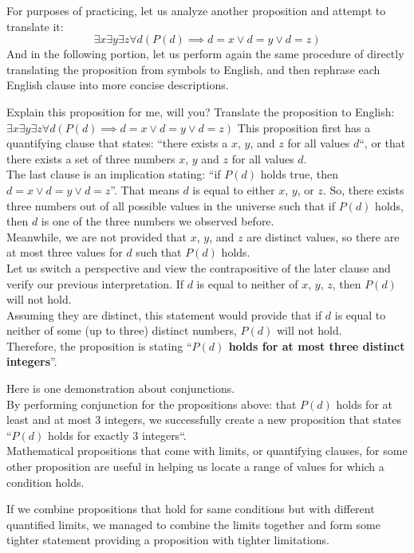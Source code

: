 For purposes of practicing, let us analyze another proposition and attempt to translate it:
\[\exists x \exists y \exists z \forall d (P(d) \implies d = x \lor d = y \lor d = z)\]
And in the following portion, let us perform again the same procedure of directly translating the proposition from symbols to English, and then rephrase each English clause into more concise descriptions.
\begin{ln-think}{Explain this proposition for me, will you?}{}
    Translate the proposition to English: $\exists x \exists y \exists z \forall d (P(d) \implies d = x \lor d = y \lor d = z)$
    \tcblower
    This proposition first has a quantifying clause that states: ``there exists a $x$, $y$, and $z$ for all values $d$``, or that there exists a set of three numbers $x$, $y$ and $z$ for all values $d$. \\
    The last clause is an implication stating: ``if $P(d)$ holds true, then $d = x \lor d = y \lor d = z$''. That means $d$ is equal to either $x$, $y$, or $z$. So, there exists three numbers out of all possible values in the universe such that if $P(d)$ holds, then $d$ is one of the three numbers we observed before. \\
    Meanwhile, we are not provided that $x$, $y$, and $z$ are distinct values, so there are at most three values for $d$ such that $P(d)$ holds.\\
    Let us switch a perspective and view the contrapositive of the later clause and verify our previous interpretation. If $d$ is equal to neither of $x$, $y$, $z$, then $P(d)$ will not hold. \\
    Assuming they are distinct, this statement would provide that if $d$ is equal to neither of some (up to three) distinct numbers, $P(d)$ will not hold. \\
    Therefore, the proposition is stating ``\textbf{$P(d)$ holds for at most three distinct integers}''.
\end{ln-think}
Here is one demonstration about conjunctions. \\
By performing conjunction for the propositions above: that $P(d)$ holds for at least and at most 3 integers, we successfully create a new proposition that states ``$P(d)$ holds for exactly 3 integers``. \\
Mathematical propositions that come with limits, or quantifying clauses, for some other proposition are useful in helping us locate a range of values for which a condition holds. 

If we combine propositions that hold for same conditions but with different quantified limits, we managed to combine the limits together and form some tighter statement providing a proposition with tighter limitations.
